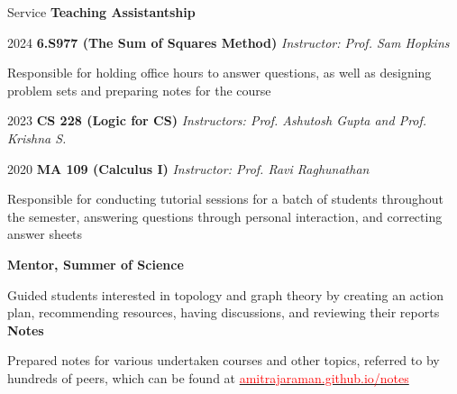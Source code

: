 
\begin{rubric}{Service}
    \entry* \textbf{Teaching Assistantship}

       2024 \quad \textbf{6.S977 (The Sum of Squares Method)} \hfill \emph{Instructor: Prof. Sam Hopkins}

       Responsible for holding office hours to answer questions, as well as designing problem sets and preparing notes for the course 
       

       2023 \quad \textbf{CS 228 (Logic for CS)} \hfill  \emph{Instructors: Prof. Ashutosh Gupta and Prof. Krishna S.}

       2020 \quad \textbf{MA 109 (Calculus I)} \hfill \emph{Instructor: Prof. Ravi Raghunathan}

	    Responsible for conducting tutorial sessions for a batch of students throughout the semester, answering questions through personal interaction, and correcting answer sheets




	\entry*[2021--2022] \textbf{Mentor, Summer of Science}

		Guided students interested in topology and graph theory by creating an action plan, recommending resources, having discussions, and reviewing their reports
	\entry*[2020--2023] \textbf{Notes}

		Prepared notes for various undertaken courses and other topics, referred to by hundreds of peers, which can be found at \href{https://amitrajaraman.github.io/notes}{\textcolor{red}{amitrajaraman.github.io/notes}}
\end{rubric}